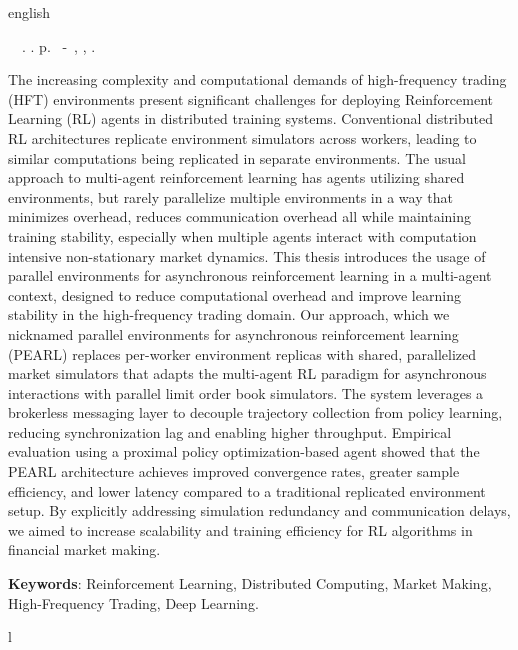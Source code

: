 \begin{resumo}[Abstract]
 \begin{otherlanguage*}{english}
	\begin{flushleft} 
		\setlength{\absparsep}{0pt} %
 		\SingleSpacing  		\imprimirautorabr~~\textbf{\imprimirtitleabstract}.	\imprimirdata.  \pageref{LastPage} p. 
		\imprimirtipotrabalhoabs~-~\imprimirinstituicao, \imprimirlocal, 	\imprimirdata. 
 	\end{flushleft}
	\OnehalfSpacing
    The increasing complexity and computational demands of high-frequency trading (HFT) environments present significant challenges for
    deploying Reinforcement Learning (RL) agents in distributed training systems.
    Conventional distributed RL architectures replicate environment simulators across workers,
    leading to similar computations being replicated in separate environments.
    The usual approach to multi-agent reinforcement learning has agents utilizing shared environments,
    but rarely parallelize multiple environments in a way that minimizes overhead, reduces communication overhead all while maintaining training stability,
    especially when multiple agents interact with computation intensive non-stationary market dynamics.
    This thesis introduces the usage of parallel environments for asynchronous reinforcement learning in a multi-agent context,
    designed to reduce computational overhead and improve learning stability in the high-frequency trading domain.
    Our approach, which we nicknamed parallel environments for asynchronous reinforcement learning (PEARL) replaces per-worker environment replicas with shared,
    parallelized market simulators that adapts the multi-agent RL paradigm for asynchronous interactions with parallel limit order book simulators.
    The system leverages a brokerless messaging layer to decouple trajectory collection from policy learning,
    reducing synchronization lag and enabling higher throughput.
    Empirical evaluation using a proximal policy optimization-based agent showed that the PEARL architecture achieves improved convergence rates, greater sample efficiency,
    and lower latency compared to a traditional replicated environment setup.
    By explicitly addressing simulation redundancy and communication delays,
    we aimed to increase scalability and training efficiency for RL algorithms in financial market making.

   \vspace{\onelineskip}
 
   \noindent 
   \textbf{Keywords}: Reinforcement Learning, Distributed Computing, Market Making, High-Frequency Trading, Deep Learning.
 \end{otherlanguage*}
\end{resumo}
l